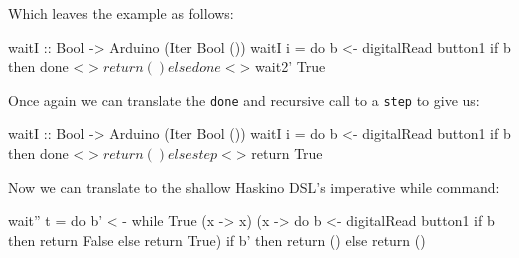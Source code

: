 \documentclass[11pt]{article}
\newcommand{\lam}{\UseVerb{Slash}} %
\begin{document}
Which leaves the example as follows:

\begin{Code}
waitI :: Bool -> Arduino (Iter Bool ())
waitI i = do
     b <- digitalRead button1
     if b then done <$> return () else done <$> wait2' True
\end{Code}

Once again we can translate the \verb|done| and recursive call
to a \verb|step| to give us:

\begin{Code}
waitI :: Bool -> Arduino (Iter Bool ())
waitI i = do
     b <- digitalRead button1
     if b then done <$> return () else step <$> return True
\end{Code}

Now we can translate to the shallow Haskino DSL's imperative
while command:

\begin{Code}
wait'' t = do
    b' < - while True (\lam x -> x) (\lam x -> do
        b <- digitalRead button1
        if b then return False else return True)
    if b'
      then return ()
      else return ()
\end{Code}
\end{document}

